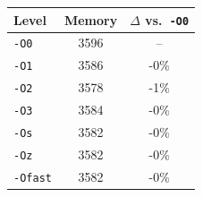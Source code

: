 \begin{tabular*}{\columnwidth}{@{\extracolsep\fill}lcc@{\extracolsep\fill}}
\toprule
\textbf{Level} & \textbf{Memory} & \textbf{$\Delta$ vs.\ \texttt{-O0}} \\
\midrule
\texttt{-O0} & 3596 & -- \\
\texttt{-O1} & 3586 & -0\% \\
\texttt{-O2} & 3578 & -1\% \\
\texttt{-O3} & 3584 & -0\% \\
\texttt{-Os} & 3582 & -0\% \\
\texttt{-Oz} & 3582 & -0\% \\
\texttt{-Ofast} & 3582 & -0\% \\
\bottomrule
\end{tabular*}

